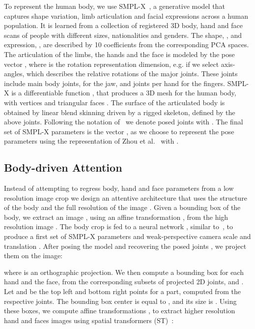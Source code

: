 \documentclass[runningheads]{llncs}
\newcommand{\smplx}{\mbox{SMPL-X}\xspace}
\newcommand{\twoD}{2D\xspace}
\newcommand{\threeD}{3D\xspace}
\newcommand{\etal}{et al.\xspace}
\newcommand{\eg}{e.g.\xspace}
\begin{document}
To represent the human body, we use \smplx~\cite{Pavlakos_2019_CVPR},
a generative model that captures shape variation,
limb articulation and facial expressions across a human population. It is learned
from a collection of registered \threeD body, hand and face scans of people with
different sizes, nationalities and genders.
The shape, , and expression, ,
are described by 10 coefficients from the corresponding PCA spaces.
The articulation of the limbs, the hands and the face is
modeled by the pose vector ,
where  is the rotation representation dimension, \eg  if we select
axis-angles,
which describes the
relative rotations of the  major joints.
These joints include  main body joints,  for the jaw,
and  joints per hand for the fingers.
\smplx is a differentiable function ,
that produces a \threeD mesh  for the human body, with  vertices  and triangular faces . The surface of the articulated body is obtained by linear blend skinning driven by a
rigged skeleton, defined by the above joints.
Following the notation of~\cite{kanazawa_cvpr_2018}
we denote posed joints with .
The final set of \smplx parameters is the vector , as we choose to represent the pose
parameters 
using the representation of Zhou \etal~\cite{zhou_2019_cvpr} with .
 \subsection{Body-driven Attention}
\label{subsec:model_training}

Instead of attempting to regress body, hand and face parameters from a low resolution image crop
we design an attentive architecture that uses the structure of the body and the
full resolution of the image .
Given a bounding box of the body,
we extract an image , using an affine transformation , from the high resolution image .
The body crop  is fed to a neural network , similar to~\cite{kanazawa_cvpr_2018},
to produce a first set of \smplx parameters  and weak-perspective
camera scale  and translation .
After posing the model and recovering the posed joints , we project them on the image:

\noindent where  is an orthographic projection.
We then compute a bounding box for each hand and the face, from the corresponding subsets of projected \twoD
joints,  and .
Let  and  be the top left and
bottom right points for a part, computed from the respective joints.
The bounding box center is equal to
,
and its size is .
Using these boxes, we compute affine
transformations ,  to extract higher resolution hand and faces images
using spatial transformers (ST)~\cite{jaderberg2015spatial}:
\end{document}
